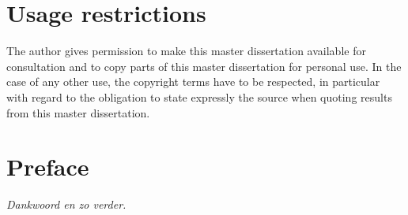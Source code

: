 \documentclass[11pt,british]{article}
\begin{document}
\renewcommand{\thepage}{\roman{page}}
\newpage
\thispagestyle{empty}
\mbox{}




\newpage{}\part*{Usage restrictions}

The author gives permission to make this master dissertation available for consultation 
and to copy parts of this master dissertation for personal use. 
 In the case of any other use, the copyright terms have to be respected, in particular with regard to 
the obligation to state expressly the source when quoting results from this master dissertation.

\pagebreak{}


\newpage{}\part*{Preface}
\emph{\color{red}Dankwoord en zo verder.}
\pagebreak{}


\newpage{}
\begin{abstract}
\end{abstract}

%


\newpage
\setcounter{tocdepth}{2}
\tableofcontents
\pagebreak


\listoffigures
\pagebreak


\end{document}
